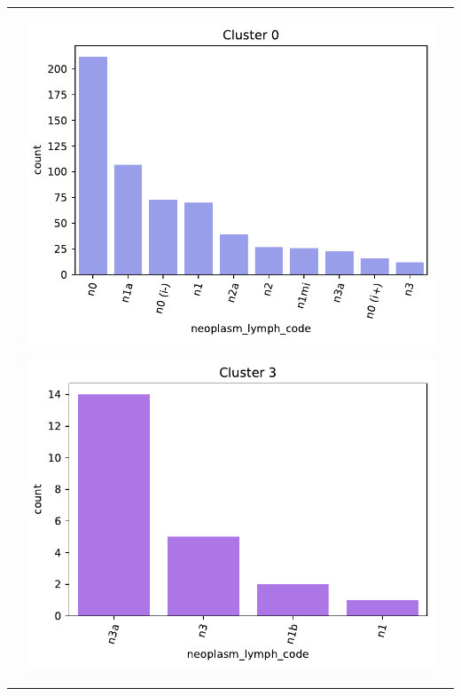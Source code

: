 \begin{table}[htb!]
\begin{threeparttable}
\begin{tabular}{p{2.5cm} p{7cm} p{6.5cm}}
			& 
			\begin{center}\includegraphics[width=1\linewidth]{NOTEBOOK/IMAGENES_BIRCH_CLUSTERING/2_Cluster_0_neoplasm_lymph_code}\end{center}
			\begin{center}\includegraphics[width=1\linewidth]{NOTEBOOK/IMAGENES_BIRCH_CLUSTERING/2_Cluster_3_neoplasm_lymph_code}\end{center}
			

\end{tabular}
\end{threeparttable}
\end{table}
